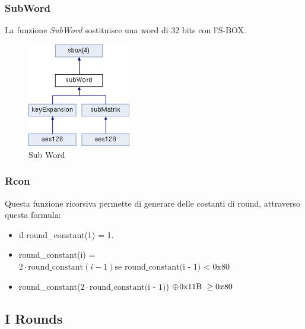 \subsubsection{SubWord}


\textsf{\small La funzione \emph{SubWord} sostituisce una word di 32 bits con l'S-BOX.}

\begin{figure}[H]
	\centering
	\includegraphics[width=0.4\textwidth, height=0.4\textheight, keepaspectratio]{./images/key_expansion/subWord.png}
	\caption{Sub Word}
	\label{fig:sub_word2}
\end{figure}

\subsubsection{Rcon}

 

\textsf{\small Questa funzione ricorsiva permette di generare delle costanti di round, attraverso questa formula:}

\begin{itemize}
	\item \textsf{\small il round\_constant(1) = 1.}
	\item \textsf{\small round\_constant(i) = $2 \cdot \text{round\_constant}(i - 1) \text{se round\_constant(i - 1) < 0x80}$}
	\item \textsf{\small round\_constant($2 \cdot \text{round\_constant(i - 1)}$) $ \oplus \hspace{0.3mm} \text{0x11B } \ge 0x80$ }
\end{itemize}

\subsection{I Rounds} %

